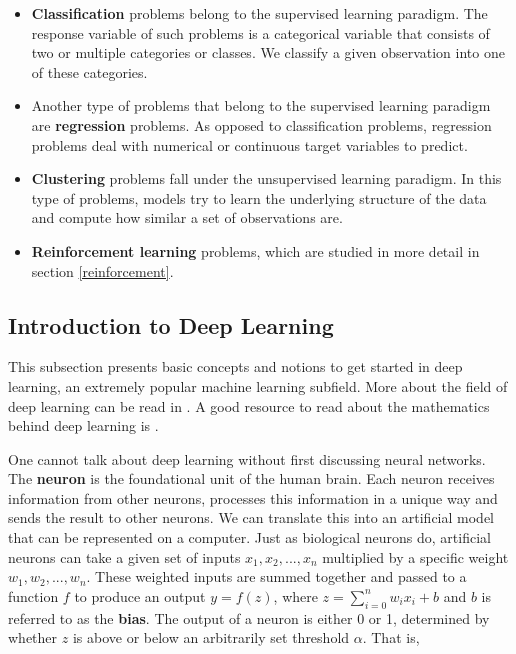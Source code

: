 \documentclass[11pt]{article}
\theoremstyle{definition}
\begin{document}
\begin{itemize}[label=\raisebox{0.25ex}{\tiny$\bullet$}]
    \item \textbf{Classification} problems belong to the supervised learning paradigm. The response variable of such problems is a categorical variable that consists of two or multiple categories or classes. We classify a given observation into one of these categories.

    \item Another type of problems that belong to the supervised learning paradigm are \textbf{regression} problems. As opposed to classification problems, regression problems deal with numerical or continuous target variables to predict.

    \item \textbf{Clustering} problems fall under the unsupervised learning paradigm. In this type of problems, models try to learn the underlying structure of the data and compute how similar a set of observations are.

    \item \textbf{Reinforcement learning} problems, which are studied in more detail in section \ref{reinforcement}. 
\end{itemize}

\subsection{Introduction to Deep Learning}

This subsection presents basic concepts and notions to get started in deep learning, an extremely popular machine learning subfield. More about the field of deep learning can be read in \cite{buduma, nielsen, goodfellow}. A good resource to read about the mathematics behind deep learning is \cite{modern_math}.

One cannot talk about deep learning without first discussing neural networks. The \textbf{neuron} is the foundational unit of the human brain. Each neuron receives information from other neurons, processes this information in a unique way and sends the result to other neurons. We can translate this into an artificial model that can be represented on a computer. Just as biological neurons do, artificial neurons can take a given set of inputs $x_1, x_2, ...,  x_n$ multiplied by a specific weight $w_1, w_2, ..., w_n$. These weighted inputs are summed together and passed to a function $f$ to produce an output $y = f(z)$, where $z = \sum_{i=0}^n w_ix_i + b$ and $b$ is referred to as the \textbf{bias}. The output of a neuron is either 0 or 1, determined by whether $z$ is above or below an arbitrarily set threshold $\alpha$. That is,   
\end{document}
